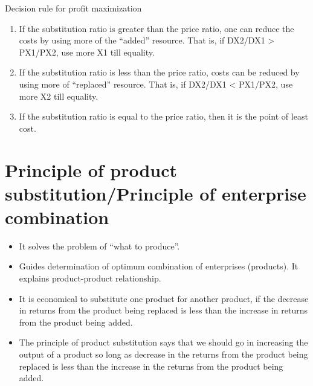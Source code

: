 \documentclass[12pt,ignorenonframetext,aspectratio=169]{beamer}
\providecommand{\tightlist}{%
  \setlength{\itemsep}{0pt}\setlength{\parskip}{0pt}}
\begin{document}
\begin{frame}{Decision rule for profit maximization}
\protect\hypertarget{decision-rule-for-profit-maximization}{}
\begin{enumerate}
\tightlist
\item
  If the substitution ratio is greater than the price ratio, one can
  reduce the costs by using more of the ``added'' resource. That is, if
  DX2/DX1 \textgreater{} PX1/PX2, use more X1 till equality.
\item
  If the substitution ratio is less than the price ratio, costs can be
  reduced by using more of ``replaced'' resource. That is, if DX2/DX1
  \textless{} PX1/PX2, use more X2 till equality.
\item
  If the substitution ratio is equal to the price ratio, then it is the
  point of least cost.
\end{enumerate}
\end{frame}

\hypertarget{principle-of-product-substitutionprinciple-of-enterprise-combination}{%
\section{Principle of product substitution/Principle of enterprise
combination}\label{principle-of-product-substitutionprinciple-of-enterprise-combination}}

\begin{frame}{}
\protect\hypertarget{section-4}{}
\begin{itemize}
\tightlist
\item
  It solves the problem of ``what to produce''.
\item
  Guides determination of optimum combination of enterprises (products).
  It explains product-product relationship.
\item
  It is economical to substitute one product for another product, if the
  decrease in returns from the product being replaced is less than the
  increase in returns from the product being added.
\item
  The principle of product substitution says that we should go in
  increasing the output of a product so long as decrease in the returns
  from the product being replaced is less than the increase in the
  returns from the product being added.
\end{itemize}
\end{frame}
\end{document}
